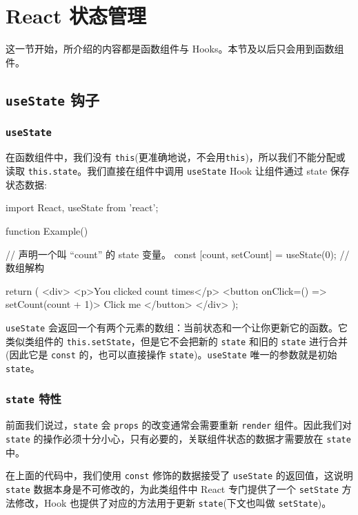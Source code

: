 \section{React 状态管理}

这一节开始，所介绍的内容都是函数组件与 Hooks。本节及以后只会用到函数组件。

\subsection{\texttt{useState} 钩子}

\subsubsection{\texttt{useState}}

在函数组件中，我们没有 \texttt{this}(更准确地说，不会用\texttt{this})，所以我们不能分配或读取 \texttt{this.state}。我们直接在组件中调用 \texttt{useState} Hook 让组件通过 state 保存状态数据:

\begin{JavaScript}
import React, { useState } from 'react';

function Example() {
  // 声明一个叫 “count” 的 state 变量。
  const [count, setCount] = useState(0);    // 数组解构

  return (
    <div>
      <p>You clicked {count} times</p>
      <button onClick={() => setCount(count + 1)}>
        Click me
      </button>
    </div>
  );
}
\end{JavaScript}

\texttt{useState} 会返回一个有两个元素的数组：当前状态和一个让你更新它的函数。它类似类组件的 \texttt{this.setState}，但是它不会把新的 \texttt{state} 和旧的 \texttt{state} 进行合并(因此它是 \texttt{const} 的，也可以直接操作 \texttt{state})。\texttt{useState} 唯一的参数就是初始 \texttt{state}。

\subsubsection*{\texttt{state} 特性}

前面我们说过，\texttt{state} 会 \texttt{props} 的改变通常会需要重新 \texttt{render} 组件。因此我们对 \texttt{state} 的操作必须十分小心，只有必要的，关联组件状态的数据才需要放在 \texttt{state} 中。

在上面的代码中，我们使用 \texttt{const} 修饰的数据接受了 \texttt{useState} 的返回值，这说明 \texttt{state} 数据本身是不可修改的，为此类组件中 React 专门提供了一个 \texttt{setState} 方法修改，Hook 也提供了对应的方法用于更新 \texttt{state}(下文也叫做 \texttt{setState})。

